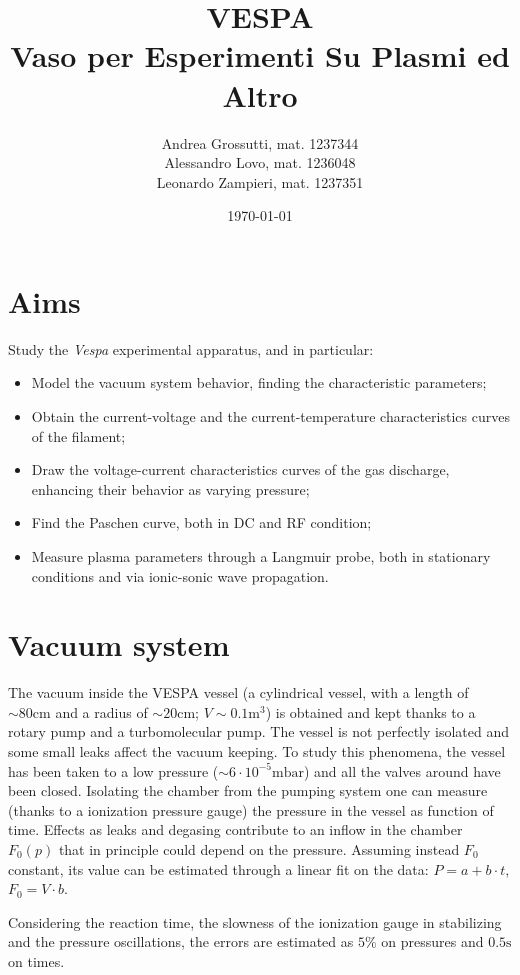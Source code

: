 \documentclass[11pt,a4 paper]{article}
\title{VESPA\\Vaso per Esperimenti Su Plasmi ed Altro}
\author{Andrea Grossutti, mat. 1237344\\Alessandro Lovo, mat. 1236048\\Leonardo Zampieri, mat. 1237351}
\date{\today}
\begin{document}
\maketitle

\section{Aims}
Study the \emph{Vespa} experimental apparatus, and in particular:
\begin{itemize}[noitemsep]
    \item Model the vacuum system behavior, finding the characteristic parameters;
    \item Obtain the current-voltage and the current-temperature characteristics curves of the filament;
    \item Draw the voltage-current characteristics curves of the gas discharge, enhancing their behavior as varying pressure;
    \item Find the Paschen curve, both in DC and RF condition;
    \item Measure plasma parameters through a Langmuir probe, both in stationary conditions and via ionic-sonic wave propagation.
\end{itemize}


\section{Vacuum system}
The vacuum inside the VESPA vessel (a cylindrical  vessel, with a length of $\sim80\si{\centi\metre}$ and a radius of $\sim20\si{\centi\metre}$; $V\sim0.1\si{\metre^3}$) is obtained and kept thanks to a rotary pump and a turbomolecular pump. The vessel is not perfectly isolated and some small leaks affect the vacuum keeping. To study this phenomena, the vessel has been taken to a low pressure ($\sim 6 \cdot 10^{-5} \si{\milli\bar}$) and all the valves around have been closed. Isolating the chamber from the pumping system one can measure (thanks to a ionization pressure gauge) the pressure in the vessel as function of time. Effects as leaks and degasing contribute to an inflow in the chamber $F_0(p)$ that in principle could depend on the pressure. Assuming instead $F_0$ constant, its value can be estimated through a linear fit on the data: $P = a + b \cdot t$, $F_0 = V \cdot b$.

Considering the reaction time, the slowness of the ionization gauge in stabilizing and the pressure oscillations, the errors are estimated as $5\%$ on pressures and $0.5\si{\second}$ on times.
\end{document}
